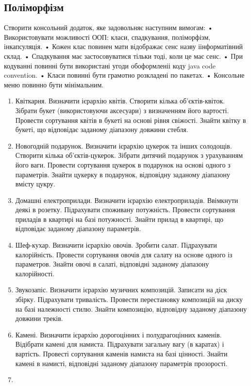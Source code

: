 \documentclass[]{article}
\begin{document}
\subsection{Поліморфізм}
Створити консольний додаток, яке задовольняє наступним вимогам:
• Використовувати можливості ООП: класи, спадкування, поліморфізм, інкапсуляція.
• Кожен клас повинен мати відображає сенс назву іінформатівний склад.
• Спадкування має застосовуватися тільки тоді, коли це має сенс.
• При кодуванні повинні бути використані угоди обоформленіі коду java code convention.
• Класи повинні бути грамотно розкладені по пакетах.
• Консольне меню повинно бути мінімальним.
\begin{enumerate}
\def\labelenumi{6.\arabic{enumi}.}
\item
Квіткарня. Визначити ієрархію квітів. Створити кілька об'єктів-квіток. Зібрати букет (використовуючи аксесуари) з визначенням його вартості. Провести сортування квітів в букеті на  основі рівня свіжості. Знайти квітку в  букеті, що відповідає заданому діапазону довжини стебля. 
\item
Новогодній подарунок. Визначити ієрархію цукерок та інших солодощів. Створити кілька об'єктів-цукерок. Зібрати дитячий подарунок з урахуванням його ваги. Провести сортування цукерок в подарунок на основі одного з параметрів. Знайти цукерку в подарунок, відповідну заданому діапазону вмісту цукру.
\item
Домашні електроприлади. Визначити ієрархію електроприладів. Ввімкнути деякі в розетку. Підрахувати споживану потужність. Провести сортування приладів в квартирі на базі потужності. Знайти прилад в квартирі, що відповідає заданому діапазону параметрів.
\item
Шеф-кухар. Визначити ієрархію овочів. Зробити салат. Підрахувати калорійність. Провести сортування овочів для салату на основе одного із параметров. Знайти овочі в салаті, відповідні заданому діапазону калорійності.
\item
Звукозапіс. Визначити ієрархію музичних композицій. Записати на діск збірку. Підрахувати тривалість. Провести перестановку композицій  на диску на базі належності стилю. Знайти композицію, відповідну заданому діапазону довжини треків.
\item
Камені. Визначити ієрархію дорогоцінних і полудрагоцінних каменів. Відібрати камені для намиста. Підрахувати загальну вагу (в каратах) і вартість. Провесті сортування каменів намиста на базі цінності. Знайти камені в намисті, відповідні заданому діапазону параметрів прозорості.
\item

\end{enumerate}
\end{document}
